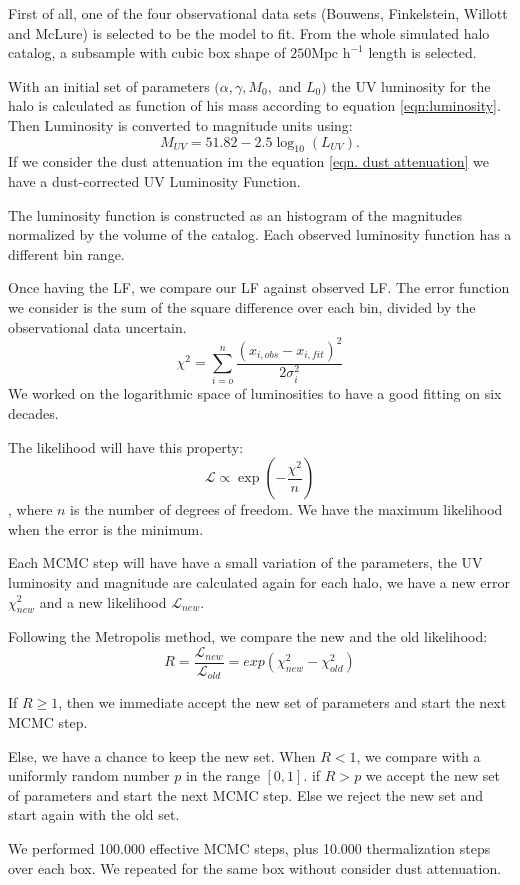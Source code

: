 \documentclass{emulateapj}
\begin{document}
First of all, one of the four observational data sets (Bouwens, Finkelstein, 
Willott and McLure) is selected to be the model to fit.
From the whole simulated halo catalog, a subsample with cubic box shape of 
 $250\textrm{Mpc h}^{-1}$ length is selected. 
 
With an initial set of parameters $(\alpha, \gamma, M_0,$ and $ L_0)$ the UV 
luminosity for the halo is calculated as function of his mass according to 
equation
 \ref{eqn:luminosity}. Then Luminosity is converted to magnitude units using:
  \[ M_{UV} = 51.82 - 2.5 \log_{10}(L_{UV}). \]
If we consider the dust attenuation im the equation \ref{eqn. dust attenuation} 
we have a dust-corrected UV Luminosity Function.

The luminosity function is constructed as an histogram of the magnitudes 
normalized by the volume of the catalog. Each observed luminosity function has a 
different bin range.

Once having the LF, we compare our LF against observed LF. The error function we 
consider is the sum of the square difference over each bin, divided by the 
observational data uncertain.
\[ \chi^2  = \sum_{i=o}^{n} \frac {\left( x_{i,obs} - x_{i,fit} \right)^2 }{2\sigma_i^2}\]
We worked on the logarithmic space of luminosities to have a good fitting on
six decades.

The likelihood will have this property:
\[ \mathcal{L} \propto \exp \left(  -\frac{\chi ^2}{n} \right) \], where $n$ is 
the number of degrees of freedom. We have the maximum likelihood when the error 
is the minimum.

Each MCMC step will have have a small variation of the parameters, the UV 
luminosity and magnitude are calculated again for each halo, we have a new error 
$\chi_{new}^2$ and a new likelihood $ \mathcal{L}_{new} $.

Following the Metropolis method, we compare the new and the old likelihood:
\[ R =\frac{ \mathcal{L}_{new}  }{ \mathcal{L}_{old} }  = 
exp( \chi_{new}^2 - \chi_{old}^2 )
\]

If $  R \geq 1$, then we immediate accept the new set of parameters and start 
the next MCMC step.

Else, we have a chance to keep the new set. When $ R < 1$, we compare with a 
uniformly random number $p$ in the range $[0,1]$. if $ R>p$ we accept the new 
set of parameters and start the next MCMC step.  Else we reject the new set and 
start again with the old set.

We performed 100.000 effective MCMC steps, plus 10.000 thermalization steps over 
each box. We repeated for the same box without consider dust attenuation.
\end{document}
